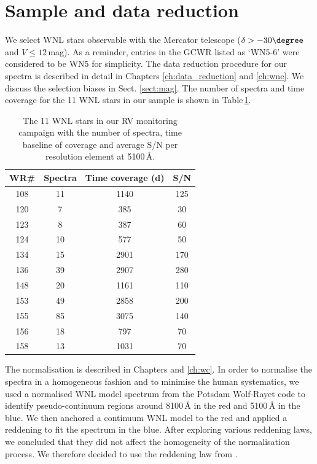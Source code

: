 \section{Sample and data reduction} \label{sect:sample_WNL}

We select WNL stars observable with the Mercator telescope ($\delta>-30\degree$ and $V\le12$\,mag). As a reminder, entries in the GCWR listed as `WN5-6' were considered to be WN5 for simplicity. The data reduction procedure for our spectra is described in detail in Chapters \ref{ch:data_reduction} and \ref{ch:wne}. We discuss the selection biases in Sect. \ref{sect:mag}. The number of spectra and time coverage for the 11 WNL stars in our sample is shown in Table\,\ref{tab:time_coverage_spec}.

\begin{table}[]
    \centering
    \caption{The 11 WNL stars in our RV monitoring campaign with the number of spectra, time baseline of coverage and average S/N per resolution element at 5100\,\r{A}.}
    \begin{tabular}{cccc}
    \hline \hline
    WR\#&Spectra&Time coverage (d)&S/N\\ \hline
    108&11&1140&125\\ 
    120&7&385&30\\ 
    123&8&387&60\\ 
    124&10&577&50\\ 
    134&15&2901&170\\ 
    136&39&2907&280\\ 
    148&20&1161&110\\ 
    153&49&2858&200\\ 
    155&85&3075&140\\ 
    156&18&797&70\\ 
    158&13&1031&70\\ 
    \hline
    \end{tabular}
    \label{tab:time_coverage_spec}
\end{table}

The normalisation is described in Chapters and \ref{ch:wc}. In order to normalise the spectra in a homogeneous fashion and to minimise the human systematics, we used a normalised WNL model spectrum from the Potsdam Wolf-Rayet code \citep{grafener_line-blanketed_2002,todt_potsdam_2015} to identify pseudo-continuum regions around 8100\,\r{A} in the red and 5100\,\r{A} in the blue. We then anchored a continuum WNL model to the red and applied a reddening to fit the spectrum in the blue. After exploring various reddening laws, we concluded that they did not affect the homogeneity of the normalisation process. We therefore decided to use the reddening law from \citet{fitzpatrick_interstellar_2004}.

